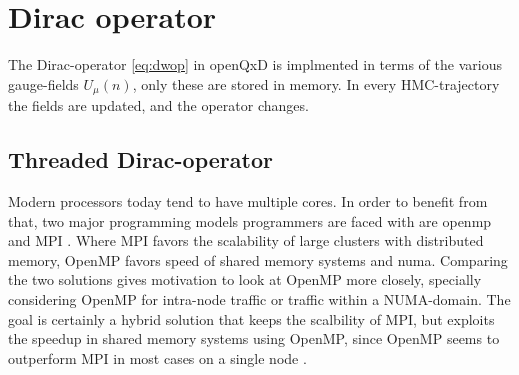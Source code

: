 \documentclass{article}
\theoremstyle{plain} %
\theoremstyle{convention} %
\theoremstyle{remark} %
\numberwithin{equation}{section}
\begin{document}
\section{Dirac operator}

\label{sec:dop}

The Dirac-operator \eqref{eq:dwop} in openQxD is implmented in terms of the various gauge-fields $U_{\mu}(n)$, only these are stored in memory. In every HMC-trajectory the fields are updated, and the operator changes.

\subsection{Threaded Dirac-operator}

\label{sec:threads}

Modern processors today tend to have multiple cores. In order to benefit from that, two major programming models programmers are faced with are \acrshort{openmp} \cite{openmp45} and \acrshort{MPI} \cite{mpi}. Where MPI favors the scalability of large clusters with distributed memory, OpenMP favors speed of shared memory systems and \acrfull{numa}. Comparing the two solutions gives motivation to look at OpenMP more closely, specially considering OpenMP for intra-node traffic or traffic within a NUMA-domain. The goal is certainly a hybrid solution that keeps the scalbility of MPI, but exploits the speedup in shared memory systems using OpenMP, since OpenMP seems to outperform MPI in most cases on a single node \cite{chan2011}.
\end{document}
